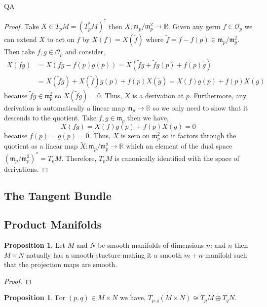 QA	 \documentclass[12pt]{extarticle}
\newcommand{\R}{\mathbb{R}}
\theoremstyle{definition}
\newtheorem{proposition}[theorem]{Proposition}
\renewcommand{\O}{\mathcal{O}}
\newcommand{\m}{\mathfrak{m}}
\begin{document}
\begin{proof}
Take $X \in T_p M = (T_p^* M)^*$ then $X : \m_p / \m_p^2 \to \R$. Given any germ $f \in \O_p$ we can extend $X$ to act on $f$ by $X(f) = X(\tilde{f})$ where $\tilde{f} = f - f(p) \in \m_p / \m_p^2$. Then take $f, g \in \O_p$ and consider,
\begin{align*}
X(fg) & = X(fg - f(p) g(p)) = X(\tilde{f} \tilde{g} + \tilde{f} g(p) + f(p) \tilde{g})
\\
& = X(\tilde{f} \tilde{g}) + X(\tilde{f}) g(p) + f(p) X(\tilde{g}) = X(f) g(p) + f(p) X(g) 
\end{align*}
because $\tilde{f} \tilde{g} \in \m_p^2$ so $X(\tilde{f} \tilde{g}) = 0$. Thus, $X$ is a derivation at $p$. Furthermore, any derivation is automatically a linear map $\m_p \to \R$ so we only need to show that it descends to the quotient. Take $f, g \in \m_p$ then we have,
\[ X(fg) = X(f) g(p) + f(p) X(g) = 0 \] 
because $f(p) = g(p) = 0$. Thus, $X$ is zero on $\m_p^2$ so it factors through the quotient as a linear map $\tilde{X} : \m_p / \m_p^2 \to \R$ which an element of the dual space $(\m_p / \m_p^2)^* = T_p M$. Therefore, $T_p M$ is canonically identified with the space of derivations. 
\end{proof}

\subsection{The Tangent Bundle}

\subsection{Product Manifolds}

\begin{proposition}
Let $M$ and $N$ be smooth manifolds of dimensions $m$ and $n$ then $M \times N$ natually has a smooth stucture making it a smooth $m + n$-manifold such that the projection maps are smooth. 
\end{proposition}

\begin{proof}

\end{proof}

\begin{proposition}
For $(p,q) \in M \times N$ we have, $T_{p,q} (M \times N) \cong T_p M \oplus T_q N$.
\end{proposition}
\end{document}
